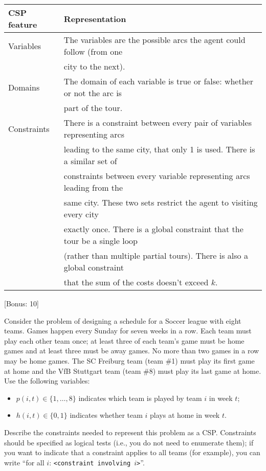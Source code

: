 \documentclass{exam}
\begin{document}
\begin{questions}
{\begin{tabular}{|l|l|}
\hline
CSP feature &Representation\\
\hline\hline
Variables   &The variables are the possible arcs the agent could follow (from one \\
        &city to the next).\\
\hline
Domains &The domain of each variable is true or false: whether or not the arc is\\
        &part of the tour.\\
\hline
Constraints &There is a constraint between every pair of variables representing arcs\\
        &leading to the same city, that only 1 is used.  There is a similar set of\\
        &constraints between every variable representing arcs leading from the\\
        &same city.  These two sets restrict the agent to visiting every city\\
        &exactly once.  There is a global constraint that the tour be a single loop\\
        &(rather than multiple partial tours).  There is also a global constraint\\
        &that the sum of the costs doesn't exceed $k$.\\
\hline
\end{tabular}
}



	[Bonus: 10]
	
Consider the problem of designing a schedule for a Soccer league with eight teams.
Games happen every Sunday for seven weeks in a row.
Each team must play each other team once; at least three of each team's game must be home games and at least three must be away games. 
No more than two games in a row may be home games.
The SC Freiburg team (team \#1) must play its first game at home and the VfB Stuttgart team (team \#8) must play its last game at home. 
Use the following variables: 
\begin{itemize}
  \item $p(i,t) \in \{1, \ldots, 8\}$ indicates which team is played by team $i$ in week $t$;
  \item $h(i,t) \in \{0, 1\}$ indicates whether team $i$ plays at home in week $t$.
\end{itemize}
 
Describe the constraints needed to represent this problem as a CSP.
Constraints should be specified as logical tests (i.e., you do not need to enumerate them); 
if you want to indicate that a constraint applies to all teams (for example), 
you can write ``for all $i$: \texttt{<constraint involving $i$>}''.


\end{questions}
\end{document}
